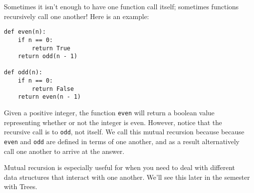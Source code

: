 Sometimes it isn't enough to have one function call itself; sometimes functions
recursively call one another!  Here is an example:
\begin{lstlisting}
def even(n):
    if n == 0:
        return True
    return odd(n - 1)

def odd(n):
    if n == 0:
        return False
    return even(n - 1)
\end{lstlisting}
Given a positive integer, the function {\tt even} will return a boolean value
representing whether or not the integer is even.  However, notice that the
recursive call is to {\tt odd}, not itself.  We call this mutual recursion
because because {\tt even} and {\tt odd} are defined in terms of one another,
and as a result alternatively call one another to arrive at the answer.

Mutual recursion is especially useful for when you need to deal with different
data structures that interact with one another.  We'll see this later in the
semester with Trees.
